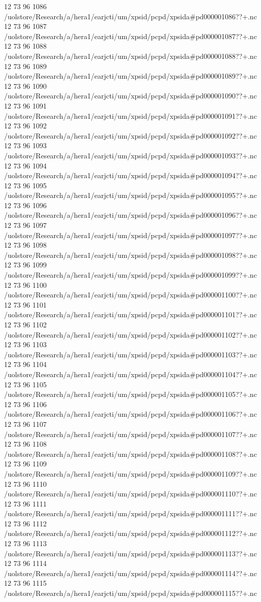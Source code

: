 12 73 96
1086
/uolstore/Research/a/hera1/earjcti/um/xpsid/pcpd/xpsida#pd000001086??+.nc
12 73 96
1087
/uolstore/Research/a/hera1/earjcti/um/xpsid/pcpd/xpsida#pd000001087??+.nc
12 73 96
1088
/uolstore/Research/a/hera1/earjcti/um/xpsid/pcpd/xpsida#pd000001088??+.nc
12 73 96
1089
/uolstore/Research/a/hera1/earjcti/um/xpsid/pcpd/xpsida#pd000001089??+.nc
12 73 96
1090
/uolstore/Research/a/hera1/earjcti/um/xpsid/pcpd/xpsida#pd000001090??+.nc
12 73 96
1091
/uolstore/Research/a/hera1/earjcti/um/xpsid/pcpd/xpsida#pd000001091??+.nc
12 73 96
1092
/uolstore/Research/a/hera1/earjcti/um/xpsid/pcpd/xpsida#pd000001092??+.nc
12 73 96
1093
/uolstore/Research/a/hera1/earjcti/um/xpsid/pcpd/xpsida#pd000001093??+.nc
12 73 96
1094
/uolstore/Research/a/hera1/earjcti/um/xpsid/pcpd/xpsida#pd000001094??+.nc
12 73 96
1095
/uolstore/Research/a/hera1/earjcti/um/xpsid/pcpd/xpsida#pd000001095??+.nc
12 73 96
1096
/uolstore/Research/a/hera1/earjcti/um/xpsid/pcpd/xpsida#pd000001096??+.nc
12 73 96
1097
/uolstore/Research/a/hera1/earjcti/um/xpsid/pcpd/xpsida#pd000001097??+.nc
12 73 96
1098
/uolstore/Research/a/hera1/earjcti/um/xpsid/pcpd/xpsida#pd000001098??+.nc
12 73 96
1099
/uolstore/Research/a/hera1/earjcti/um/xpsid/pcpd/xpsida#pd000001099??+.nc
12 73 96
1100
/uolstore/Research/a/hera1/earjcti/um/xpsid/pcpd/xpsida#pd000001100??+.nc
12 73 96
1101
/uolstore/Research/a/hera1/earjcti/um/xpsid/pcpd/xpsida#pd000001101??+.nc
12 73 96
1102
/uolstore/Research/a/hera1/earjcti/um/xpsid/pcpd/xpsida#pd000001102??+.nc
12 73 96
1103
/uolstore/Research/a/hera1/earjcti/um/xpsid/pcpd/xpsida#pd000001103??+.nc
12 73 96
1104
/uolstore/Research/a/hera1/earjcti/um/xpsid/pcpd/xpsida#pd000001104??+.nc
12 73 96
1105
/uolstore/Research/a/hera1/earjcti/um/xpsid/pcpd/xpsida#pd000001105??+.nc
12 73 96
1106
/uolstore/Research/a/hera1/earjcti/um/xpsid/pcpd/xpsida#pd000001106??+.nc
12 73 96
1107
/uolstore/Research/a/hera1/earjcti/um/xpsid/pcpd/xpsida#pd000001107??+.nc
12 73 96
1108
/uolstore/Research/a/hera1/earjcti/um/xpsid/pcpd/xpsida#pd000001108??+.nc
12 73 96
1109
/uolstore/Research/a/hera1/earjcti/um/xpsid/pcpd/xpsida#pd000001109??+.nc
12 73 96
1110
/uolstore/Research/a/hera1/earjcti/um/xpsid/pcpd/xpsida#pd000001110??+.nc
12 73 96
1111
/uolstore/Research/a/hera1/earjcti/um/xpsid/pcpd/xpsida#pd000001111??+.nc
12 73 96
1112
/uolstore/Research/a/hera1/earjcti/um/xpsid/pcpd/xpsida#pd000001112??+.nc
12 73 96
1113
/uolstore/Research/a/hera1/earjcti/um/xpsid/pcpd/xpsida#pd000001113??+.nc
12 73 96
1114
/uolstore/Research/a/hera1/earjcti/um/xpsid/pcpd/xpsida#pd000001114??+.nc
12 73 96
1115
/uolstore/Research/a/hera1/earjcti/um/xpsid/pcpd/xpsida#pd000001115??+.nc
